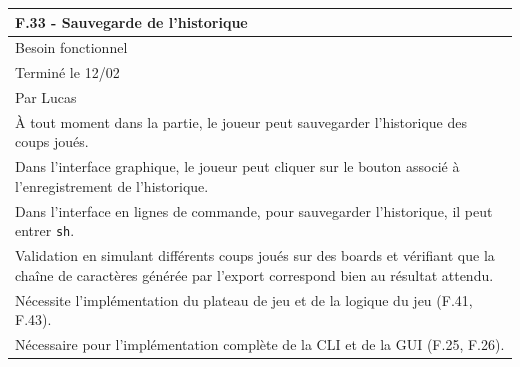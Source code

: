 \documentclass[a4paper,12pt]{article}
\begin{document}
\vspace{1cm}

\noindent
\setlength{\arrayrulewidth}{1.5pt}
\renewcommand{\arraystretch}{1.5}
\begin{tabularx}{\textwidth}{|X|}
    \hline
    \textbf{F.33 - Sauvegarde de l’historique}                                                                                                                      \\
    \hline
    Besoin fonctionnel                                                                                                                                              \\
    \hline
    Terminé le 12/02                                                                                                                                                \\
    Par Lucas                                                                                                                                                       \\
    \hline
    À tout moment dans la partie, le joueur peut sauvegarder l’historique des coups joués.                                                                          \\
    Dans l’interface graphique, le joueur peut cliquer sur le bouton associé à l’enregistrement de l’historique.                                                    \\
    Dans l’interface en lignes de commande, pour sauvegarder l’historique, il peut entrer \texttt{sh}.                                                              \\
    \arrayrulecolor{MediumAquamarine}\hline
    \arrayrulecolor{CornflowerBlue}
    Validation en simulant différents coups joués sur des boards et vérifiant que la chaîne de caractères générée par l’export correspond bien au résultat attendu. \\
    \arrayrulecolor{MediumAquamarine}\hline
    \arrayrulecolor{CornflowerBlue}
    Nécessite l’implémentation du plateau de jeu et de la logique du jeu (F.41, F.43).                                                                              \\
    Nécessaire pour l’implémentation complète de la CLI et de la GUI (F.25, F.26).                                                                                  \\
    \hline
\end{tabularx}
\end{document}
